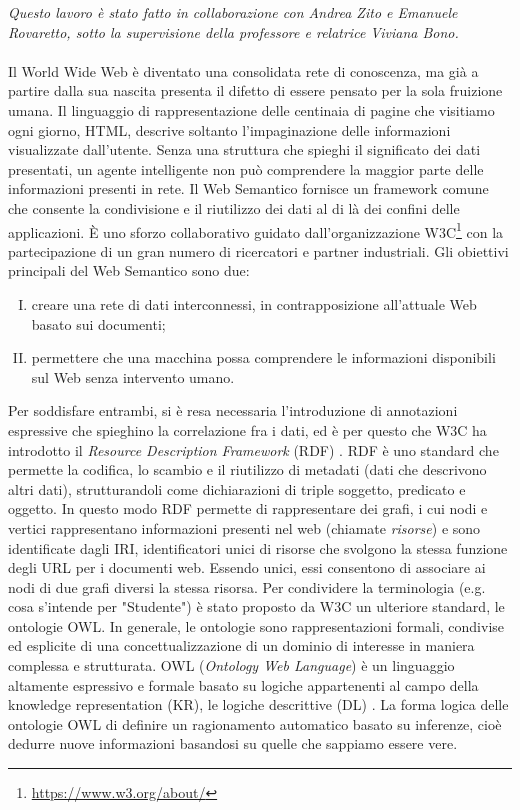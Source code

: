 \textsl{Questo lavoro è stato fatto in collaborazione con Andrea Zito e Emanuele Rovaretto, sotto la supervisione della professore e relatrice Viviana Bono.}\\\\
Il World Wide Web è diventato una consolidata rete di conoscenza, ma già a partire dalla sua nascita presenta il difetto di essere pensato per la sola fruizione umana. Il linguaggio di rappresentazione delle centinaia di pagine che visitiamo ogni giorno, HTML, descrive soltanto l’impaginazione delle informazioni visualizzate dall'utente. Senza una struttura che spieghi il significato dei dati presentati, un agente intelligente non può comprendere la maggior parte delle informazioni presenti in rete. 
Il Web Semantico fornisce un framework comune che consente la condivisione e il riutilizzo dei dati al di là dei confini delle applicazioni. È uno sforzo collaborativo guidato dall'organizzazione W3C\footnote{\url{https://www.w3.org/about/}} con la partecipazione di un gran numero di ricercatori e partner industriali. Gli obiettivi principali del Web Semantico \cite{berners2001semantic, hitzler2021review} sono due:
\begin{enumerate}[I)]
	\item creare una rete di dati interconnessi, in contrapposizione all'attuale Web basato sui documenti;
	\item permettere che una macchina possa comprendere le informazioni disponibili sul Web senza intervento umano.
\end{enumerate}
Per soddisfare entrambi, si è resa necessaria l'introduzione di annotazioni espressive che spieghino la correlazione fra i dati, ed è per questo che W3C ha introdotto il \textit{Resource Description Framework} (RDF) \cite{RDFspecification}. RDF è uno standard che permette la codifica, lo scambio e il riutilizzo di metadati (dati che descrivono altri dati), strutturandoli come dichiarazioni di triple soggetto, predicato e oggetto. In questo modo RDF permette di rappresentare dei grafi, i cui nodi e vertici rappresentano informazioni presenti nel web (chiamate \textit{risorse}) e sono identificate dagli IRI, identificatori unici di risorse che svolgono la stessa funzione degli URL per i documenti web. Essendo unici, essi consentono di associare ai nodi di due grafi diversi la stessa risorsa. Per condividere la terminologia (e.g. cosa s'intende per "Studente") è stato proposto da W3C un ulteriore standard, le ontologie OWL. In generale, le ontologie sono rappresentazioni formali, condivise ed esplicite di una concettualizzazione di un dominio di interesse \cite{goy2015ontologies} in maniera complessa e strutturata. OWL (\textit{Ontology Web Language}) è un linguaggio altamente espressivo e formale basato su logiche appartenenti al campo della knowledge representation (KR), le logiche descrittive (DL) \cite{baader2017introductionDL}. La forma logica delle ontologie OWL di definire un ragionamento automatico basato su inferenze, cioè dedurre nuove informazioni basandosi su quelle che sappiamo essere vere.

